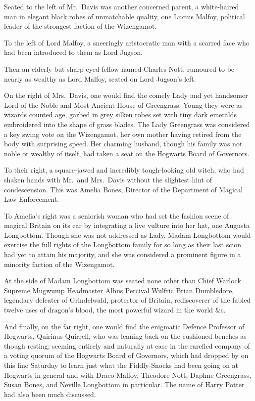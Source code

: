 Seated to the left of Mr.~Davis was another concerned parent, a
white-haired man in elegant black robes of unmatchable quality, one
Lucius Malfoy, political leader of the strongest faction of the
Wizengamot.

To the left of Lord Malfoy, a sneeringly aristocratic man with a scarred
face who had been introduced to them as Lord Jugson.

Then an elderly but sharp-eyed fellow named Charles Nott, rumoured to be
nearly as wealthy as Lord Malfoy, seated on Lord Jugson's left.

On the right of Mrs.~Davis, one would find the comely Lady and yet
handsomer Lord of the Noble and Most Ancient House of Greengrass. Young
they were as wizards counted age, garbed in grey silken robes set with
tiny dark emeralds embroidered into the shape of grass blades. The Lady
Greengrass was considered a key swing vote on the Wizengamot, her own
mother having retired from the body with surprising speed. Her charming
husband, though his family was not noble or wealthy of itself, had taken
a seat on the Hogwarts Board of Governors.

To their right, a square-jawed and incredibly tough-looking old witch,
who had shaken hands with Mr.~and Mrs.~Davis without the slightest hint
of condescension. This was Amelia Bones, Director of the Department of
Magical Law Enforcement.

To Amelia's right was a seniorish woman who had set the fashion scene of
magical Britain on its ear by integrating a live vulture into her hat,
one Augusta Longbottom. Though she was not addressed as Lady, Madam
Longbottom would exercise the full rights of the Longbottom family for
so long as their last scion had yet to attain his majority, and she was
considered a prominent figure in a minority faction of the Wizengamot.

At the side of Madam Longbottom was seated none other than Chief Warlock
Supreme Mugwump Headmaster Albus Percival Wulfric Brian Dumbledore,
legendary defeater of Grindelwald, protector of Britain, rediscoverer of
the fabled twelve uses of dragon's blood, the most powerful wizard in
the world \&c.

And finally, on the far right, one would find the enigmatic Defence
Professor of Hogwarts, Quirinus Quirrell, who was leaning back on the
cushioned benches as though resting; seeming entirely and naturally at
ease in the rarefied company of a voting quorum of the Hogwarts Board of
Governors, which had dropped by on this fine Saturday to learn just what
the Fiddly-Snocks had been going on at Hogwarts in general and with
Draco Malfoy, Theodore Nott, Daphne Greengrass, Susan Bones, and Neville
Longbottom in particular. The name of Harry Potter had also been much
discussed.

